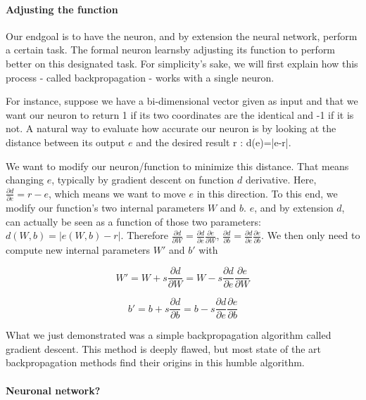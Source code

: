 \documentclass[conference]{IEEEtran}
\begin{document}
\paragraph{Adjusting the function}

Our endgoal is to have the neuron, and by extension the neural network, perform
a certain task. The formal neuron \og learns\fg by adjusting its function to perform better on
this designated task. For simplicity's sake, we will first explain how this
process - called \og backpropagation\fg{} - works with a single neuron.

For instance, suppose we have a bi-dimensional vector given as input and that we
want our neuron to return 1 if its two coordinates are the identical and -1 if
it is not. A natural way to evaluate how accurate our neuron is by looking at the
distance between its output $e$ and the desired result r : d(e)=|e-r|.

We want to modify our neuron/function to minimize this distance. That means
changing $e$, typically by gradient descent on function $d$ derivative. Here,
$\frac{\partial d}{\partial e} = r-e$, which means we want to \og move\fg{} $e$ in this
direction. To this end, we modify our function's two internal parameters $W$ and
$b$. $e$, and by extension $d$, can actually be seen as a function of those two
parameters: $d(W,b)=|e(W,b)-r|$. Therefore $\frac{\partial d}{\partial W}
   = \frac{\partial d}{\partial e}\frac{\partial e}{\partial W}$,
$\frac{\partial d}{\partial b}
   = \frac{\partial d}{\partial e}\frac{\partial e}{\partial b}$. We then only
   need to compute new internal parameters $W'$ and $b'$ with 

\begin{equation}
     W'=W + s\frac{\partial d}{\partial W}=W-s\frac{\partial d}{\partial e}\frac{\partial e}{\partial W}
\end{equation}

\begin{equation}
     b'=b + s\frac{\partial d}{\partial b}=b-s\frac{\partial d}{\partial e}\frac{\partial e}{\partial b}
\end{equation}

What we just demonstrated was a simple backpropagation algorithm called gradient
descent. This method is deeply flawed, but most state of the art backpropagation
methods find their origins in this humble algorithm.

\paragraph{Neuronal network?}
\end{document}
